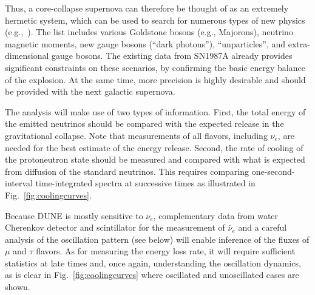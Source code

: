 Thus, a core-collapse supernova can therefore be thought of as an extremely hermetic system, which can be used to search for numerous types of new physics (e.g.,~\cite{Schramm:1990pf,Raffelt:1999tx}). The list includes various Goldstone bosons (e.g., Majorons), neutrino magnetic moments, new gauge bosons (``dark photons''), ``unparticles'', and extra-dimensional gauge bosons. The existing data from SN1987A already provides significant constraints on these scenarios, by confirming the basic energy balance of the explosion. At the same time, more precision is highly desirable and should be provided with the next galactic supernova. 




The analysis will make use of two types of information. First, the total energy of the emitted neutrinos should be compared with the expected release in the gravitational collapse.  Note that measurements of all flavors, including $\nu_e$, are needed for the best estimate of the energy release.
Second, the rate of cooling of the protoneutron state should be measured and compared with what is expected from diffusion of the standard neutrinos. This requires comparing one-second-interval time-integrated spectra at successive times as illustrated in Fig.~\ref{fig:coolingcurves}. 

Because DUNE is mostly sensitive to $\nu_e$, complementary data from water Cherenkov detector and scintillator for the measurement of $\bar\nu_{e}$ and a careful analysis of the oscillation pattern (see below) will enable inference of the fluxes of $\mu$ and $\tau$ flavors. As for measuring the energy loss rate, it will require sufficient statistics at late times and, once again, understanding the oscillation dynamics, as is clear in Fig.~\ref{fig:coolingcurves} where oscillated and unoscillated cases are shown.

